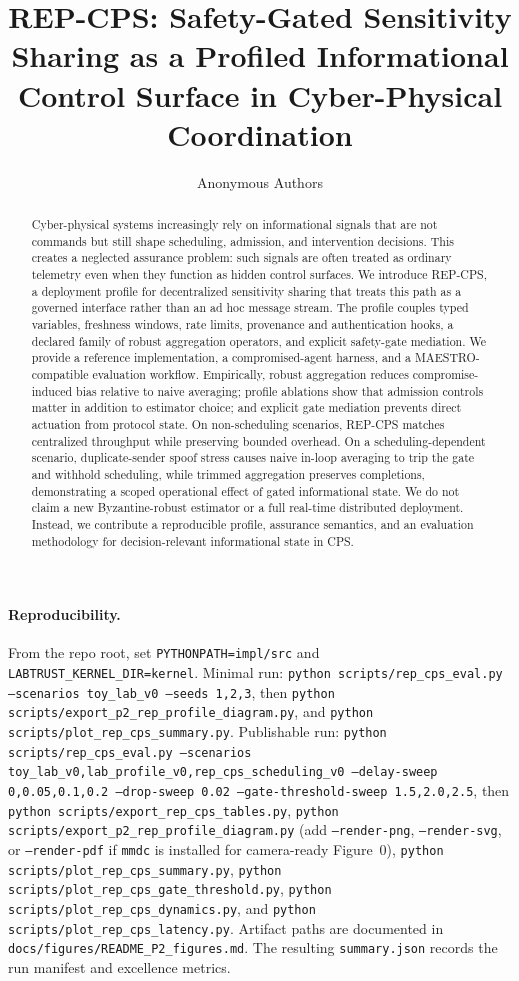 \documentclass[11pt]{article}
\title{\textbf{REP-CPS: Safety-Gated Sensitivity Sharing as a Profiled Informational Control Surface in Cyber-Physical Coordination}}
\author{Anonymous Authors}
\date{}
\newcommand{\repcps}{REP-CPS}
\newcommand{\maestro}{MAESTRO}
\newcommand{\tool}[1]{\texttt{#1}}
\newcommand{\field}[1]{\texttt{#1}}
\newcommand{\code}[1]{\texttt{#1}}
\begin{document}
\maketitle

\begin{abstract}
Cyber-physical systems increasingly rely on informational signals that are not commands but still shape scheduling, admission, and intervention decisions. This creates a neglected assurance problem: such signals are often treated as ordinary telemetry even when they function as hidden control surfaces. We introduce \repcps{}, a deployment profile for decentralized sensitivity sharing that treats this path as a governed interface rather than an ad hoc message stream. The profile couples typed variables, freshness windows, rate limits, provenance and authentication hooks, a declared family of robust aggregation operators, and explicit safety-gate mediation. We provide a reference implementation, a compromised-agent harness, and a \maestro-compatible evaluation workflow. Empirically, robust aggregation reduces compromise-induced bias relative to naive averaging; profile ablations show that admission controls matter in addition to estimator choice; and explicit gate mediation prevents direct actuation from protocol state. On non-scheduling scenarios, \repcps{} matches centralized throughput while preserving bounded overhead. On a scheduling-dependent scenario, duplicate-sender spoof stress causes naive in-loop averaging to trip the gate and withhold scheduling, while trimmed aggregation preserves completions, demonstrating a scoped operational effect of gated informational state. We do not claim a new Byzantine-robust estimator or a full real-time distributed deployment. Instead, we contribute a reproducible profile, assurance semantics, and an evaluation methodology for decision-relevant informational state in CPS.
\end{abstract}

\paragraph{Reproducibility.}
From the repo root, set \code{PYTHONPATH=impl/src} and \code{LABTRUST\_KERNEL\_DIR=kernel}. Minimal run: \tool{python scripts/rep\_cps\_eval.py --scenarios toy\_lab\_v0 --seeds 1,2,3}, then \tool{python scripts/export\_p2\_rep\_profile\_diagram.py}, and \tool{python scripts/plot\_rep\_cps\_summary.py}. Publishable run: \tool{python scripts/rep\_cps\_eval.py --scenarios toy\_lab\_v0,lab\_profile\_v0,rep\_cps\_scheduling\_v0 --delay-sweep 0,0.05,0.1,0.2 --drop-sweep 0.02 --gate-threshold-sweep 1.5,2.0,2.5}, then \tool{python scripts/export\_rep\_cps\_tables.py}, \tool{python scripts/export\_p2\_rep\_profile\_diagram.py} (add \tool{--render-png}, \tool{--render-svg}, or \tool{--render-pdf} if \tool{mmdc} is installed for camera-ready Figure~0), \tool{python scripts/plot\_rep\_cps\_summary.py}, \tool{python scripts/plot\_rep\_cps\_gate\_threshold.py}, \tool{python scripts/plot\_rep\_cps\_dynamics.py}, and \tool{python scripts/plot\_rep\_cps\_latency.py}. Artifact paths are documented in \tool{docs/figures/README\_P2\_figures.md}. The resulting \field{summary.json} records the run manifest and excellence metrics.
\end{document}
